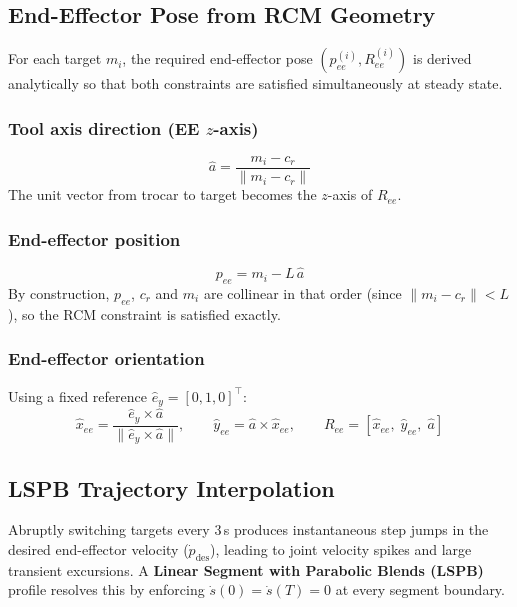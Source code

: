 \documentclass[11pt,a4paper]{article}
\begin{document}
\subsection{End-Effector Pose from RCM Geometry}

For each target $m_i$, the required end-effector pose $(p_{ee}^{(i)}, R_{ee}^{(i)})$
is derived analytically so that both constraints are satisfied simultaneously
at steady state.

\subsubsection*{Tool axis direction (EE $z$-axis)}
\begin{equation}
  \hat{a} = \frac{m_i - c_r}{\|m_i - c_r\|}
\end{equation}
The unit vector from trocar to target becomes the $z$-axis of $R_{ee}$.

\subsubsection*{End-effector position}
\begin{equation}
  p_{ee} = m_i - L\,\hat{a}
\end{equation}
By construction, $p_{ee}$, $c_r$ and $m_i$ are collinear in that order
(since $\|m_i-c_r\|<L$), so the RCM constraint is satisfied exactly.

\subsubsection*{End-effector orientation}
Using a fixed reference $\hat{e}_y=[0,1,0]^\top$:
\begin{equation}
  \hat{x}_{ee}=\frac{\hat{e}_y\times\hat{a}}{\|\hat{e}_y\times\hat{a}\|},
  \qquad\hat{y}_{ee}=\hat{a}\times\hat{x}_{ee},
  \qquad R_{ee}=[\hat{x}_{ee},\;\hat{y}_{ee},\;\hat{a}]
\end{equation}

\subsection{LSPB Trajectory Interpolation}

Abruptly switching targets every 3\,s produces instantaneous step jumps in
the desired end-effector velocity ($\dot{p}_{\mathrm{des}}$), leading to
joint velocity spikes and large transient excursions. A \textbf{Linear Segment
with Parabolic Blends (LSPB)} profile resolves this by enforcing $\dot{s}(0)=\dot{s}(T)=0$
at every segment boundary.
\end{document}
